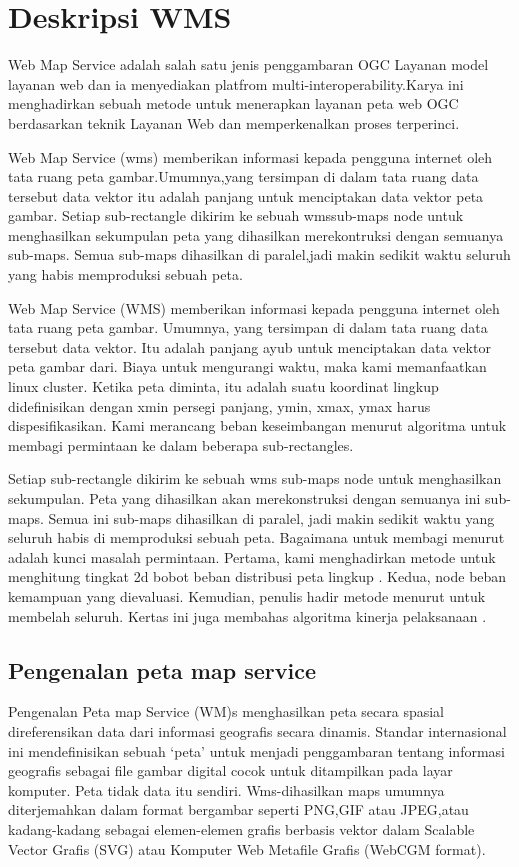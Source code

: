 
\section{Deskripsi WMS}
  Web Map Service adalah salah satu jenis penggambaran OGC Layanan model layanan web dan ia menyediakan platfrom
multi-interoperability.Karya ini menghadirkan sebuah metode untuk menerapkan layanan peta web OGC berdasarkan teknik
Layanan Web dan memperkenalkan proses terperinci.
  
    Web Map Service (wms) memberikan informasi kepada pengguna internet oleh tata ruang peta gambar.Umumnya,yang tersimpan
di dalam tata ruang data tersebut data vektor itu adalah panjang untuk menciptakan data vektor peta gambar.
Setiap sub-rectangle dikirim ke sebuah wmssub-maps node untuk menghasilkan sekumpulan peta yang dihasilkan merekontruksi
dengan semuanya sub-maps. Semua sub-maps dihasilkan di paralel,jadi makin sedikit waktu seluruh yang habis memproduksi
sebuah peta.

   Web Map Service (WMS) memberikan informasi kepada pengguna internet oleh tata ruang peta gambar. Umumnya,
yang tersimpan di dalam tata ruang data tersebut data vektor. Itu adalah panjang ayub untuk 
menciptakan data vektor peta gambar dari. Biaya untuk mengurangi waktu, maka kami memanfaatkan linux cluster.
Ketika peta diminta, itu adalah suatu koordinat lingkup didefinisikan dengan xmin persegi panjang, ymin, xmax, ymax harus dispesifikasikan. Kami merancang beban keseimbangan menurut algoritma untuk membagi permintaan ke dalam 
beberapa sub-rectangles.

   Setiap sub-rectangle dikirim ke sebuah wms sub-maps node untuk menghasilkan sekumpulan.
Peta yang dihasilkan akan merekonstruksi dengan semuanya ini sub-maps. Semua ini sub-maps dihasilkan di paralel, 
jadi makin sedikit waktu yang seluruh habis di memproduksi sebuah peta. Bagaimana untuk membagi menurut adalah 
kunci masalah permintaan. Pertama, kami menghadirkan metode untuk menghitung tingkat 2d bobot beban distribusi peta lingkup .
Kedua, node beban kemampuan yang dievaluasi. Kemudian, penulis hadir metode menurut untuk membelah seluruh.
Kertas ini juga membahas algoritma kinerja pelaksanaan .

\subsection{Pengenalan peta map service}
   Pengenalan Peta map Service (WM)s menghasilkan peta secara spasial direferensikan data dari informasi geografis secara dinamis. 
Standar internasional ini mendefinisikan sebuah `peta' untuk menjadi penggambaran tentang informasi geografis 
sebagai file gambar digital cocok untuk ditampilkan pada layar komputer. Peta tidak data itu sendiri. 
Wms-dihasilkan maps umumnya diterjemahkan dalam format bergambar seperti PNG,GIF atau JPEG,atau kadang-kadang sebagai
elemen-elemen grafis berbasis vektor dalam Scalable Vector Grafis (SVG) atau Komputer Web Metafile Grafis (WebCGM format).

